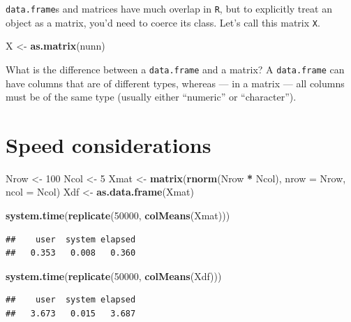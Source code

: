 \documentclass[]{book}
\newenvironment{Shaded}{\begin{snugshade}}{\end{snugshade}}
\newcommand{\KeywordTok}[1]{\textcolor[rgb]{0.13,0.29,0.53}{\textbf{#1}}}
\newcommand{\DataTypeTok}[1]{\textcolor[rgb]{0.13,0.29,0.53}{#1}}
\newcommand{\DecValTok}[1]{\textcolor[rgb]{0.00,0.00,0.81}{#1}}
\newcommand{\StringTok}[1]{\textcolor[rgb]{0.31,0.60,0.02}{#1}}
\newcommand{\OperatorTok}[1]{\textcolor[rgb]{0.81,0.36,0.00}{\textbf{#1}}}
\newcommand{\NormalTok}[1]{#1}
\theoremstyle{definition}
\theoremstyle{definition}
\theoremstyle{definition}
\theoremstyle{remark}
\begin{document}
\texttt{data.frame}s and matrices have much overlap in \texttt{R}, but
to explicitly treat an object as a matrix, you'd need to coerce its
class. Let's call this matrix \texttt{X}.

\begin{Shaded}
\begin{Highlighting}[]
\NormalTok{X <-}\StringTok{ }\KeywordTok{as.matrix}\NormalTok{(nunn)}
\end{Highlighting}
\end{Shaded}

What is the difference between a \texttt{data.frame} and a matrix? A
\texttt{data.frame} can have columns that are of different types,
whereas --- in a matrix --- all columns must be of the same type
(usually either ``numeric'' or ``character'').

\section{Speed considerations}\label{speed-considerations}

\begin{Shaded}
\begin{Highlighting}[]
\NormalTok{Nrow <-}\StringTok{ }\DecValTok{100}
\NormalTok{Ncol <-}\StringTok{ }\DecValTok{5}
\NormalTok{Xmat <-}\StringTok{ }\KeywordTok{matrix}\NormalTok{(}\KeywordTok{rnorm}\NormalTok{(Nrow }\OperatorTok{*}\StringTok{ }\NormalTok{Ncol), }\DataTypeTok{nrow =}\NormalTok{ Nrow, }\DataTypeTok{ncol =}\NormalTok{ Ncol)}
\NormalTok{Xdf <-}\StringTok{ }\KeywordTok{as.data.frame}\NormalTok{(Xmat)}

\KeywordTok{system.time}\NormalTok{(}\KeywordTok{replicate}\NormalTok{(}\DecValTok{50000}\NormalTok{, }\KeywordTok{colMeans}\NormalTok{(Xmat)))}
\end{Highlighting}
\end{Shaded}

\begin{verbatim}
##    user  system elapsed 
##   0.353   0.008   0.360
\end{verbatim}

\begin{Shaded}
\begin{Highlighting}[]
\KeywordTok{system.time}\NormalTok{(}\KeywordTok{replicate}\NormalTok{(}\DecValTok{50000}\NormalTok{, }\KeywordTok{colMeans}\NormalTok{(Xdf)))}
\end{Highlighting}
\end{Shaded}

\begin{verbatim}
##    user  system elapsed 
##   3.673   0.015   3.687
\end{verbatim}
\end{document}
